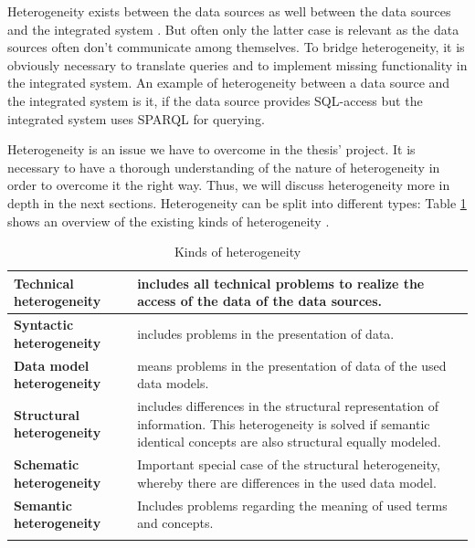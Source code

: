 Heterogeneity exists between the data sources as well between the data sources and the integrated system \cite[p. 60]{DBLP:books/dp/LeserN2006}. But often only the latter case is relevant as the data sources often don't communicate among themselves. To bridge heterogeneity, it is obviously necessary to translate queries and to implement missing functionality in the integrated system. An example of heterogeneity between a data source and the integrated system is it, if the data source provides SQL-access but the integrated system uses SPARQL for querying.

Heterogeneity is an issue we have to overcome in the thesis' project. It is necessary to have a thorough understanding of the nature of heterogeneity in order to overcome it the right way. Thus, we will discuss heterogeneity more in depth in the next sections. Heterogeneity can be split into different types: Table \ref{kinds-of-heterogeneity} shows an overview of the existing kinds of heterogeneity \cite[p. 60/61]{DBLP:books/dp/LeserN2006}.

\begin{longtable}{|l|p{}|}
\hline
 \textbf{Technical  heterogeneity}  &  includes all technical problems to realize the access of the data of the data sources.\\ \hline
 \textbf{Syntactic  heterogeneity}    &  includes problems in the presentation of data.\\ \hline
 \textbf{Data model  heterogeneity} &  means problems in the presentation of data of the used data models. \\ \hline
 \textbf{Structural  heterogeneity}    &  includes differences in the structural representation of information. This heterogeneity is solved if semantic identical concepts are also structural equally modeled. \\ \hline
 \textbf{Schematic  heterogeneity} &  Important special case of the structural heterogeneity, whereby there are differences in the used data model.\\ \hline
 \textbf{Semantic  heterogeneity}    &  Includes problems regarding the meaning of used terms and concepts.\\ \hline
\caption{Kinds of heterogeneity \cite[p. 60/61]{DBLP:books/dp/LeserN2006}}
\label{kinds-of-heterogeneity}
\end{longtable}

